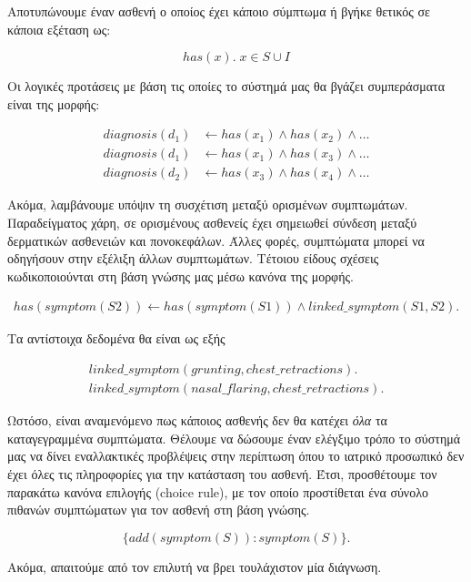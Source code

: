 \documentclass[12pt]{extarticle}
\begin{document}
Αποτυπώνουμε έναν ασθενή ο οποίος έχει κάποιο σύμπτωμα ή βγήκε θετικός σε κάποια εξέταση ως: 

\begin{equation}
    has(x). \; x \in S \cup I
\end{equation}

Οι λογικές προτάσεις με βάση τις οποίες το σύστημά μας θα βγάζει συμπεράσματα είναι της μορφής: 

\begin{align}
    diagnosis(d_1) & \longleftarrow has(x_1) \land has(x_2) \land \dots \\
    diagnosis(d_1) & \longleftarrow has(x_1) \land has(x_3) \land \dots \\
    diagnosis(d_2) & \longleftarrow has(x_3) \land has(x_4) \land \dots
\end{align}

Ακόμα, λαμβάνουμε υπόψιν τη συσχέτιση μεταξύ ορισμένων συμπτωμάτων.
Παραδείγματος χάρη, σε ορισμένους ασθενείς έχει σημειωθεί σύνδεση  
μεταξύ δερματικών ασθενειών και πονοκεφάλων\cite{migraine-hives}.
Άλλες φορές, συμπτώματα μπορεί να οδηγήσουν στην εξέλιξη άλλων συμπτωμάτων.
Τέτοιου είδους σχέσεις κωδικοποιούνται στη βάση γνώσης μας μέσω κανόνα της μορφής.

\begin{align}
    has(symptom(S2)) \longleftarrow has(symptom(S1)) \land linked\_symptom(S1, S2).
\end{align}

Τα αντίστοιχα δεδομένα θα είναι ως εξής

\begin{align}
    linked\_symptom(grunting, chest\_retractions).\\
    linked\_symptom(nasal\_flaring, chest\_retractions).
\end{align}

Ωστόσο, είναι αναμενόμενο πως κάποιος ασθενής δεν θα κατέχει \textit{όλα} τα καταγεγραμμένα συμπτώματα.
Θέλουμε να δώσουμε έναν ελέγξιμο τρόπο το σύστημά μας να δίνει εναλλακτικές προβλέψεις
στην περίπτωση όπου το ιατρικό προσωπικό δεν έχει όλες τις πληροφορίες για την κατάσταση του ασθενή.
Έτσι, προσθέτουμε τον παρακάτω κανόνα επιλογής (choice rule), με τον οποίο προστίθεται 
ένα σύνολο πιθανών συμπτώματων για τον ασθενή στη βάση γνώσης.

\begin{equation}
    \{ add(symptom(S)) : symptom(S) \}.
\end{equation}

Ακόμα, απαιτούμε από τον επιλυτή να βρει τουλάχιστον μία διάγνωση.
\end{document}
